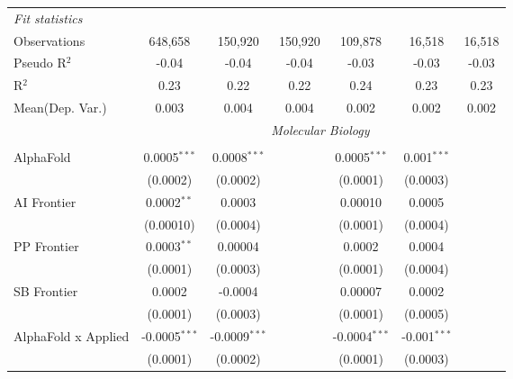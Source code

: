 \begin{tabular}{lcccccc}
   \midrule
   \emph{Fit statistics}\\
   Observations                   & 648,658         & 150,920         & 150,920         & 109,878         & 16,518         & 16,518\\  
   Pseudo R$^2$                   & -0.04           & -0.04           & -0.04           & -0.03           & -0.03          & -0.03\\  
   R$^2$                          & 0.23            & 0.22            & 0.22            & 0.24            & 0.23           & 0.23\\  
Mean(Dep. Var.) & 0.003 & 0.004 & 0.004 & 0.002 & 0.002 & 0.002 \\
   
 & \multicolumn{6}{c}{\textit{Molecular Biology}} \\ \\
   AlphaFold                      & 0.0005$^{***}$  & 0.0008$^{***}$  &                 & 0.0005$^{***}$  & 0.001$^{***}$  &   \\   
                                  & (0.0002)        & (0.0002)        &                 & (0.0001)        & (0.0003)       &   \\   
   AI Frontier                    & 0.0002$^{**}$   & 0.0003          &                 & 0.00010         & 0.0005         &   \\   
                                  & (0.00010)       & (0.0004)        &                 & (0.0001)        & (0.0004)       &   \\   
   PP Frontier                    & 0.0003$^{**}$   & 0.00004         &                 & 0.0002          & 0.0004         &   \\   
                                  & (0.0001)        & (0.0003)        &                 & (0.0001)        & (0.0004)       &   \\   
   SB Frontier                    & 0.0002          & -0.0004         &                 & 0.00007         & 0.0002         &   \\   
                                  & (0.0001)        & (0.0003)        &                 & (0.0001)        & (0.0005)       &   \\   
   AlphaFold x Applied            & -0.0005$^{***}$ & -0.0009$^{***}$ &                 & -0.0004$^{***}$ & -0.001$^{***}$ &   \\   
                                  & (0.0001)        & (0.0002)        &                 & (0.0001)        & (0.0003)       &   \\   

\end{tabular}
